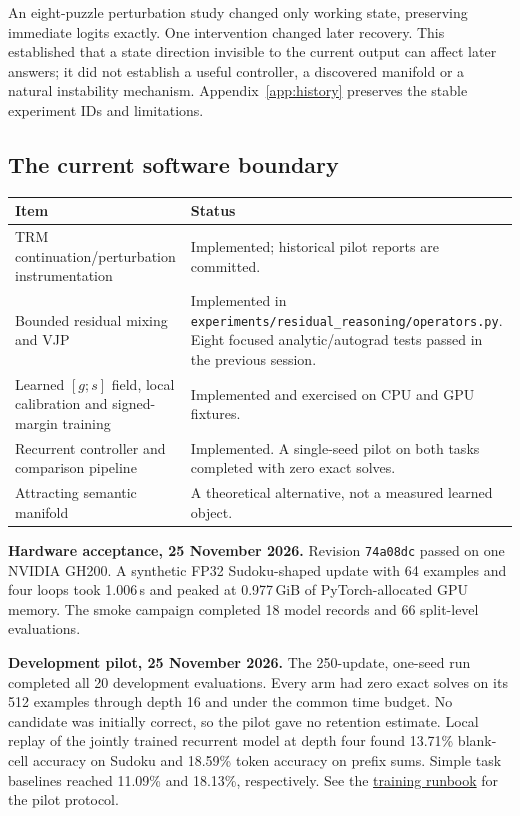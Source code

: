 \documentclass[11pt,a4paper]{article}
\newcommand{\code}[1]{\nolinkurl{#1}}
\begin{document}
An eight-puzzle perturbation study changed only working state, preserving immediate logits exactly. One intervention changed later recovery. This established that a state direction invisible to the current output can affect later answers; it did not establish a useful controller, a discovered manifold or a natural instability mechanism. Appendix~\ref{app:history} preserves the stable experiment IDs and limitations.

\subsection{The current software boundary}
\begin{tabularx}{\linewidth}{@{}P{40mm}Y@{}}\toprule
Item & Status\\\midrule
TRM continuation/perturbation instrumentation & Implemented; historical pilot reports are committed.\\
Bounded residual mixing and VJP & Implemented in \code{experiments/residual_reasoning/operators.py}. Eight focused analytic/autograd tests passed in the previous session.\\
Learned $[g;s]$ field, local calibration and signed-margin training & Implemented and exercised on CPU and GPU fixtures.\\
Recurrent controller and comparison pipeline & Implemented. A single-seed pilot on both tasks completed with zero exact solves.\\
Attracting semantic manifold & A theoretical alternative, not a measured learned object.\\\bottomrule
\end{tabularx}

\textbf{Hardware acceptance, 25 November 2026.} Revision \code{74a08dc} passed on one NVIDIA GH200. A synthetic FP32 Sudoku-shaped update with 64 examples and four loops took 1.006\,s and peaked at 0.977\,GiB of PyTorch-allocated GPU memory. The smoke campaign completed 18 model records and 66 split-level evaluations.

\textbf{Development pilot, 25 November 2026.} The 250-update, one-seed run completed all 20 development evaluations. Every arm had zero exact solves on its 512 examples through depth 16 and under the common time budget. No candidate was initially correct, so the pilot gave no retention estimate. Local replay of the jointly trained recurrent model at depth four found 13.71\% blank-cell accuracy on Sudoku and 18.59\% token accuracy on prefix sums. Simple task baselines reached 11.09\% and 18.13\%, respectively. See the \href{https://github.com/NiccoGrillo/TinyRecursiveModels/blob/74a08dc8e1bdf9dd4c10531944c7e8537c11fa38/docs/RESIDUAL_TRAINING.md}{training runbook} for the pilot protocol.
\end{document}
